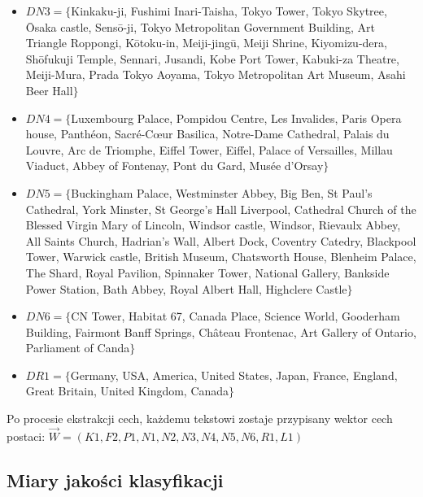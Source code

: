 \documentclass{classrep}
\begin{document}
\begin{itemize}
\item $DN3 = \{$Kinkaku-ji, Fushimi Inari-Taisha, Tokyo Tower, Tokyo Skytree,  Ōsaka castle, Sensō-ji, Tokyo Metropolitan Government Building, Art Triangle Roppongi, Kōtoku-in, Meiji-jingū, Meiji Shrine, Kiyomizu-dera, Shōfukuji Temple, Sennari, Jusandi, Kobe Port Tower, Kabuki-za Theatre, Meiji-Mura, Prada Tokyo Aoyama, Tokyo Metropolitan Art Museum, Asahi Beer Hall$\} $
\item $DN4 = \{$Luxembourg Palace, Pompidou Centre, Les Invalides, Paris Opera house, Panthéon, Sacré-Cœur Basilica, Notre-Dame Cathedral, Palais du Louvre, Arc de Triomphe, Eiffel Tower, Eiffel, Palace of Versailles, Millau Viaduct, Abbey of Fontenay, Pont du Gard, Musée d'Orsay$\} $
\item $DN5 = \{$Buckingham Palace, Westminster Abbey, Big Ben, St Paul's Cathedral, York Minster, St George's Hall Liverpool, Cathedral Church of the Blessed Virgin Mary of Lincoln, Windsor castle, Windsor, Rievaulx Abbey, All Saints Church, Hadrian's Wall, Albert Dock, Coventry Catedry, Blackpool Tower, Warwick castle, British Museum, Chatsworth House, Blenheim Palace, The Shard, Royal Pavilion, Spinnaker Tower, National Gallery, Bankside Power Station, Bath Abbey, Royal Albert Hall, Highclere Castle$\} $
\item $DN6 = \{$CN Tower, Habitat 67, Canada Place, Science World, Gooderham Building, Fairmont Banff Springs, Château Frontenac, Art Gallery of Ontario, Parliament of Canda$\} $
\item $DR1 = \{$Germany, USA, America, United States, Japan, France, England, Great Britain, United Kingdom, Canada$\}$
\end{itemize} \hfill \break
Po procesie ekstrakcji cech, każdemu tekstowi zostaje przypisany wektor cech postaci:
$\vec{W} = (K1, F2, P1, N1, N2, N3, N4, N5, N6, R1, L1)$

\subsection{Miary jakości klasyfikacji}
\end{document}
